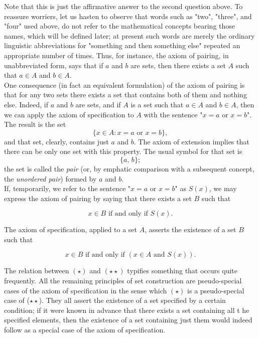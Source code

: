 Note that this is just the affirmative answer to the second question above. To reassure worriers, let us hasten to observe that words such as "two", "three", and "four" used above, do not refer to the mathematical concepts bearing those
names, which will be defined later; at present such words are merely the ordinary linguistic abbreviations for "something and then something else" repeated an appropriate number of times. Thus, for instance, the axiom of pairing, in unabbreviated form, says that if $a$ and $b$ are sets, then there exists a set $A$ such that $a \in A$ and $b \in A$.\\

One consequence (in fact an equivalent formulation) of the axiom of pairing is that for any two sets there exists a set that contains both of them and nothing else. Indeed, if $a$ and $b$ are sets, and if $A$ is a set such that $a \in A$ and $b \in A$, then we can apply the axiom of specification to $A$ with the sentence "$x = a \text{ or } x = b$". The
result is the set
\[
	\{ x \in A : x = a \text{ or } x = b\},
\]
and that set, clearly, contains just $a$ and $b$. The axiom of extension implies that there can be only one set with this property. The usual symbol for that set is
\[
	\{a, \, b\};
\]
the set is called the \textit{pair} (or, by emphatic comparison with a subsequent concept, the \textit{unordered pair}) formed by $a$ and $b$.\\

If, temporarily, we refer to the sentence "$x = a \text{ or } x = b$" as $S(x)$, we may express the axiom of pairing by saying that there exists a set $B$ such that
 
\begin{equation}
	x \in B \text{ if and only if } S(x). \tag{$\star$}
\end{equation}

The axiom of specification, applied to a set $A$, asserts the existence of a set $B$ such that

\begin{equation}
	x \in B \text{ if and only if } (x \in A \text{ and } S(x)). \tag{$\star\star$}
\end{equation}

The relation between $(\star)$ and $(\star\star)$ typifies something that occurs quite frequently. All the remaining principles of set construction are pseudo-special cases of the axiom of specification in the sense which $(\star)$ is a pseudo-special case of ($\star\star$). They all assert the existence of a set specified by a certain condition; if it were known in advance that there exists a set containing all t he specified elements, then the existence of a set containing just them would indeed follow as a special case of the axiom of specification.\\

